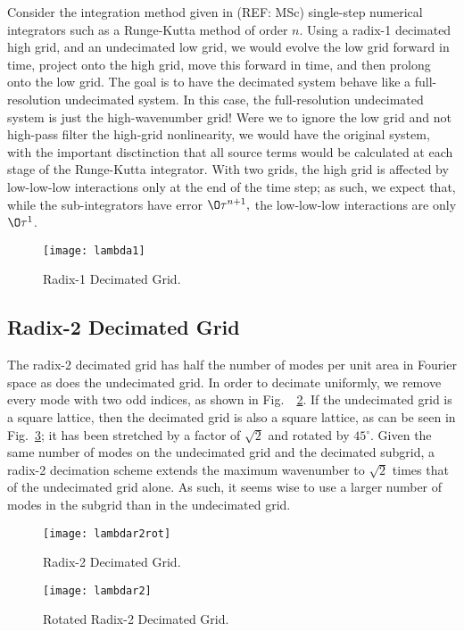 \documentclass[10pt,showpacs,showkeys,%
amsfonts,amsmath,
onecolumn,
floatfix,aps,superscriptaddress]{revtex4}
\begin{document}
Consider the integration method given in (REF: MSc) single-step
numerical integrators such as a Runge-Kutta method of order $n$.
Using a radix-1 decimated high grid, and an undecimated low grid, we
would evolve the low grid forward in time, project onto the high grid,
move this forward in time, and then prolong onto the low grid.  The
goal is to have the decimated system behave like a full-resolution
undecimated system.  In this case, the full-resolution undecimated
system is just the high-wavenumber grid!  Were we to ignore the low
grid and not high-pass filter the high-grid nonlinearity, we would
have the original system, with the important disctinction that all
source terms would be calculated at each stage of the Runge-Kutta
integrator.  With two grids, the high grid is affected by low-low-low
interactions only at the end of the time step; as such, we expect that,
while the sub-integrators have error $\O\tau^{n+1},$ the low-low-low
interactions are only $\O\tau^1$.

\begin{figure}[htbp]
  \begin{center}
    \texttt{[image: lambda1]}
    \caption{Radix-1 Decimated Grid.}
    \label{lambda1}
  \end{center}
\end{figure}


\subsection{Radix-2 Decimated Grid}
The radix-2 decimated grid has half the number of modes per unit area
in Fourier space as does the undecimated grid.  In order to decimate uniformly,
we remove every mode with two odd indices, as shown in Fig.\ ~\ref{lambdar2rot}.
If the undecimated grid is a square lattice, then the decimated grid is also
a square lattice, as can be seen in Fig.\ \ref{lambdar2}; it has been
stretched by a factor of $\sqrt{2}$ and rotated by $45\ensuremath{^\circ}$.
Given the same number of modes on the undecimated grid and the decimated
subgrid, a radix-2 decimation scheme extends the maximum wavenumber to 
$\sqrt{2}$ times that of the undecimated grid alone. As such, it seems wise
to use a larger number of modes in the subgrid than in the undecimated grid.


\begin{figure}[htbp]
  \begin{center}
    \texttt{[image: lambdar2rot]}
    \caption{Radix-2 Decimated Grid.}
    \label{lambdar2rot}
  \end{center}
\end{figure}
\begin{figure}[htbp]
  \begin{center}
    \texttt{[image: lambdar2]}
    \caption{Rotated Radix-2 Decimated Grid.}
    \label{lambdar2}
  \end{center}
\end{figure}
\end{document}
